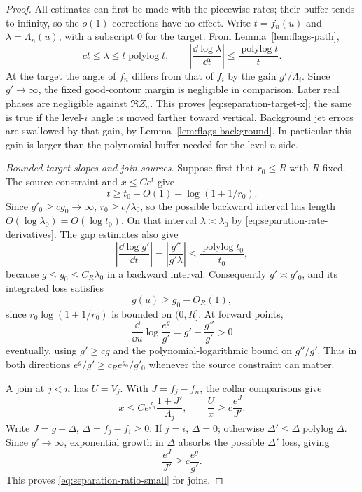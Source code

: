 \begin{proof}
All estimates can first be made with the piecewise rates; their
buffer tends to infinity, so the $o(1)$ corrections have no
effect.  Write $t=f_n(u)$ and $\lambda=\Lambda_n(u)$, with a
subscript $0$ for the target.  From
Lemma~\ref{lem:flags-path},
\begin{equation}\label{eq:separation-rate-derivatives}
 c t\leq\lambda\leq t\operatorname{polylog}t,
 \qquad
 \left|\frac{\dd\log\lambda}{\dd t}\right|
       \leq\frac{\operatorname{polylog}t}{t}.
\end{equation}
At the target the angle of $f_n$ differs from that of $f_i$ by
the gain $g'/\Lambda_i$.  Since $g'\to\infty$, the fixed
good-contour margin is negligible in comparison.  Later real
phases are negligible against $\Re Z_n$.  This proves
\eqref{eq:separation-target-x}; the same is true if the level-$i$
angle is moved farther toward vertical.  Background jet errors
are swallowed by that gain, by
Lemma~\ref{lem:flags-background}.  In particular this gain is
larger than the polynomial buffer needed for the level-$n$ side.

\emph{Bounded target slopes and join sources.}
Suppose first that $r_0\leq R$ with $R$ fixed.
The source constraint and $x\leq Ce^t$ give
\begin{equation}\label{eq:separation-backward-t}
 t\geq t_0-O(1)-\log(1+1/r_0).
\end{equation}
Since $g'_0\geq cg_0\to\infty$,
$r_0\geq c/\lambda_0$, so the possible backward interval has
length $O(\log\lambda_0)=O(\log t_0)$.  On that interval
$\lambda\asymp\lambda_0$ by
\eqref{eq:separation-rate-derivatives}.  The gap estimates also give
\[
 \left|\frac{\dd\log g'}{\dd t}\right|
   =\left|\frac{g''}{g'\lambda}\right|
   \leq\frac{\operatorname{polylog}t_0}{t_0},
\]
because $g\leq g_0\leq C_R\lambda_0$ in a backward interval.
Consequently $g'\asymp g'_0$, and its integrated loss satisfies
\begin{equation}\label{eq:separation-gap-backstep}
 g(u)\geq g_0-O_R(1),
\end{equation}
since $r_0\log(1+1/r_0)$ is bounded on $(0,R]$.
At forward points,
\[
 \frac{\dd}{\dd u}\log\frac{e^g}{g'}
       =g'-\frac{g''}{g'}>0
\]
eventually, using $g'\geq cg$ and the polynomial-logarithmic
bound on $g''/g'$.  Thus in both directions
$e^g/g'\geq c_R e^{g_0}/g'_0$ whenever the source constraint
can matter.

A join at $j<n$ has $U=V_j$.  With $J=f_j-f_n$, the collar
comparisons give
\[
 x\leq C e^{f_n}\frac{1+J'}{\Lambda_j},\qquad
 \frac{U}{x}\geq c\frac{e^J}{J'}.
\]
Write $J=g+\Delta$, $\Delta=f_j-f_i\geq0$.  If $j=i$,
$\Delta=0$; otherwise $\Delta'\leq\Delta\operatorname{polylog}\Delta$.
Since $g'\to\infty$, exponential growth in $\Delta$ absorbs
the possible $\Delta'$ loss, giving
\[
 \frac{e^J}{J'}\geq c\frac{e^g}{g'}.
\]
This proves \eqref{eq:separation-ratio-small} for joins.


\end{proof}
